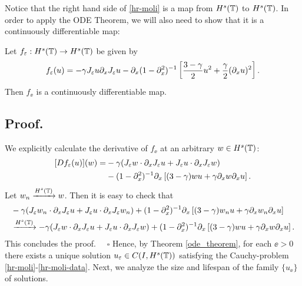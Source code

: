 %
%
Notice that the right hand side of \eqref{hr-moli} is a map from $H^s(\mathbb{T})$
to $H^s(\mathbb{T})$.  In order to apply the ODE Theorem, we will also need to
show that it is a continuously differentiable map:
%
%
%
\begin{lemma}
	Let $f_\varepsilon:H^s(\mathbb{T}) \to H^s(\mathbb{T})$ be given by 
	\begin{equation}
		\label{f_ep}
		f_{\varepsilon}(u) = -\gamma  J_\varepsilon u \partial_x J_\varepsilon u
		- \partial_x (1-\partial_x^2)^{-1} \left
		[\frac{3-\gamma}{2}u^2 + \frac{\gamma}{2}(\partial_x u)^2 \right ].
	\end{equation}
	Then $f_\ee$  is a continuously differentiable map.
\end{lemma}
%
%
\subsection{ Proof.} We explicitly calculate the derivative of $f_\ee$ at an
arbitrary $w \in H^s(\mathbb{T})$:
\begin{equation*}
	\begin{split}
		[Df_{\varepsilon}(u)](w)
		=
		& -\gamma (J_\varepsilon w \cdot \partial_x J_\varepsilon u +
		J_\varepsilon u \cdot \partial_x J_\varepsilon w)
		\\
		& - (1-\partial_x ^2)^{-1}
		\partial_x \left [(3-\gamma)w u + \gamma\partial_x w \partial_x u \right ].
	\end{split}
\end{equation*}
Let $w_n \xrightarrow{H^s(\mathbb{T})} w$. Then it is easy to check that
%
\begin{equation}
	\begin{split}
		& -\gamma (J_\varepsilon w_n \cdot \partial_x J_\varepsilon u 
		+ J_\varepsilon u \cdot \partial_x J_\varepsilon w_n)
		+ (1-\partial_x ^2)^{-1}
		\partial_x \left [(3-\gamma)w_n u + \gamma\partial_x w_n \partial_x u \right ]
		\\
		& \xrightarrow{H^s(\mathbb{T})} 
		 -\gamma (J_\varepsilon w \cdot \partial_x J_\varepsilon u 
		+ J_\varepsilon u \cdot \partial_x J_\varepsilon w) + (1-\partial_x ^2)^{-1}
		\partial_x \left [(3-\gamma)w u + \gamma\partial_x w \partial_x u \right ].
	\end{split}
\end{equation}
This concludes the proof. $\quad \square$
Hence, by Theorem \ref{ode_theorem}, for each $\ee > 0$ there exists a
unique solution $u_\varepsilon \in C(I, H^s(\mathbb{T}))$ satisfying the Cauchy-problem
\eqref{hr-moli}-\eqref{hr-moli-data}. Next, we analyze the size and
lifespan of the family $\{u_\ee\}$ of solutions.
%
%
%
%
